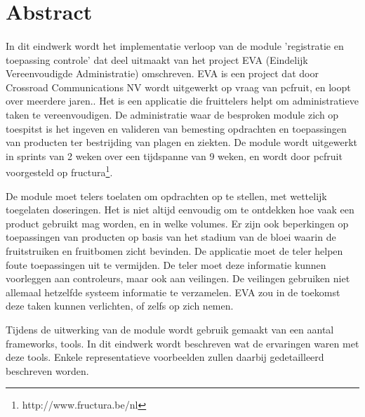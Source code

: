 \section* {Abstract}

\paragraph {}In dit eindwerk wordt het implementatie verloop van de module 'registratie en
toepassing controle' dat deel uitmaakt van het project EVA (Eindelijk Vereenvoudigde
Administratie) omschreven. EVA is een project dat door Crossroad Communications NV wordt
uitgewerkt op vraag van pcfruit, en loopt over meerdere jaren..  Het is een applicatie die
fruittelers helpt om administratieve taken te vereenvoudigen.  De administratie waar de
besproken module zich op toespitst is het ingeven en valideren van bemesting opdrachten en
toepassingen van producten ter bestrijding van plagen en ziekten. De module wordt
uitgewerkt in sprints van 2 weken over een tijdspanne van 9 weken, en wordt door pcfruit
voorgesteld op fructura\footnote{http://www.fructura.be/nl}.

De module moet telers toelaten om opdrachten op te stellen, met wettelijk
toegelaten doseringen. Het is niet altijd eenvoudig om te ontdekken hoe vaak een product
gebruikt mag worden, en in welke volumes. Er zijn ook beperkingen op toepassingen van
producten op basis van het stadium van de bloei waarin de fruitstruiken en fruitbomen
zicht bevinden. De applicatie moet de teler helpen foute toepassingen uit te vermijden.
De teler moet deze informatie kunnen voorleggen aan controleurs, maar ook aan veilingen.
De veilingen gebruiken niet allemaal hetzelfde systeem informatie te verzamelen. EVA zou
in de toekomst deze taken kunnen verlichten, of zelfs op zich nemen.

Tijdens de uitwerking van de module wordt gebruik gemaakt van een aantal frameworks,
tools. In dit eindwerk wordt beschreven wat de ervaringen waren met deze tools. Enkele
representatieve voorbeelden zullen daarbij gedetailleerd beschreven worden.


